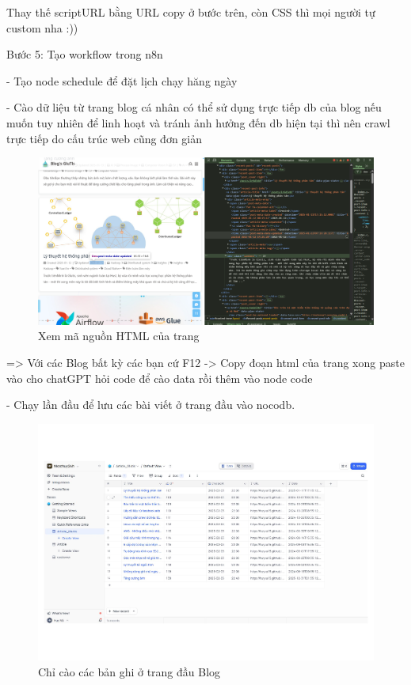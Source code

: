Thay thế scriptURL bằng URL copy ở bước trên, còn CSS thì mọi người tự custom nha :))

Bước 5: Tạo workflow trong n8n

- Tạo node schedule để đặt lịch chạy hăng ngày

- Cào dữ liệu từ trang blog cá nhân có thể sử dụng trực tiếp db của blog nếu muốn tuy nhiên để linh hoạt và tránh ảnh hưởng đến db hiện tại thì nên crawl trực tiếp do cấu trúc web cũng đơn giản

\begin{figure}[htbp]
    \centering
    \includegraphics[width=1\linewidth]{Chap1-7/HTML_view.pdf}
    \caption{Xem mã nguồn HTML của trang}
\end{figure}

=> Với các Blog bất kỳ các bạn cứ F12 -> Copy đoạn html của trang xong paste vào cho chatGPT hỏi code để cào data rồi thêm vào node code

\newpage

- Chạy lần đầu để lưu các bài viết ở trang đầu vào nocodb.

\begin{figure}[htbp]
    \centering
    \includegraphics[width=1\linewidth]{Chap1-7/nocodb-article.pdf}
    \caption{Chỉ cào các bản ghi ở trang đầu Blog}
\end{figure}

